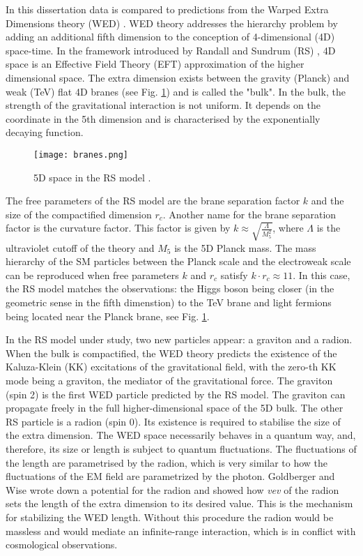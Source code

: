 In this dissertation data is compared to predictions from the Warped Extra Dimensions theory (WED) \cite{Oliveira:2014kla}. WED theory addresses the hierarchy problem by adding an additional fifth dimension to the conception of 4-dimensional (4D) space-time. In the framework introduced by Randall and Sundrum (RS) \cite{Randall:1999ee}, 4D space is an Effective Field Theory (EFT) approximation of the higher dimensional space. The extra dimension exists between the gravity (Planck) and weak (TeV) flat 4D branes (see Fig. \ref{branes}) and is called the "bulk". In the bulk, the strength of the gravitational interaction is not uniform. It depends on the coordinate in the 5th dimension and is characterised by the exponentially decaying function.




\begin{figure}[H]
\centering
\texttt{[image: branes.png]}
\caption[RS branes]{5D space in the RS model \cite{Xanda}.}
\label{branes}
\end{figure}




The free parameters of the RS model are the brane separation factor $k$ and the size of the compactified dimension $r_c$. Another name for the brane separation factor is the curvature factor. This factor is given by $k \approx \sqrt{ \frac{\Lambda}{M^2_5}  }$, where $\Lambda$ is the ultraviolet cutoff of the theory and $M_5$ is the 5D Planck mass. %
The mass hierarchy of the SM particles between the Planck scale and the electroweak scale can be reproduced when free parameters $k$ and $r_c$ satisfy $k \cdot r_c \approx 11$. In this case, the RS model matches the observations: the Higgs boson being closer (in the geometric sense in the fifth dimenstion) to the TeV brane and light fermions being located near the Planck brane, see Fig. \ref{branes}.

In the RS model under study, two new particles appear: a graviton and a radion. When the bulk is compactified, the WED theory predicts the existence of the Kaluza-Klein (KK) \cite{Uzawa:1999pg} excitations of the gravitational field, with the zero-th KK mode being a graviton, the mediator of the gravitational force. The graviton (spin 2) is the first WED particle predicted by the RS model. The graviton can propagate freely in the full higher-dimensional space of the 5D bulk. The other RS particle is a radion (spin 0). Its existence is required to stabilise the size of the extra dimension. The WED space necessarily behaves in a quantum way, and, therefore, its size or length is subject to quantum fluctuations. The fluctuations of the length are parametrised by the radion, which is very similar to how the fluctuations of the EM field are parametrized by the photon. Goldberger and Wise \cite{Goldberger:1999uk} wrote down a potential for the radion and showed how \textit{vev} of the radion sets the length of the extra dimension to its desired value. This is the mechanism for stabilizing the WED length. Without this procedure the radion would be massless and would mediate an infinite-range interaction, which is in conflict with cosmological observations. 


